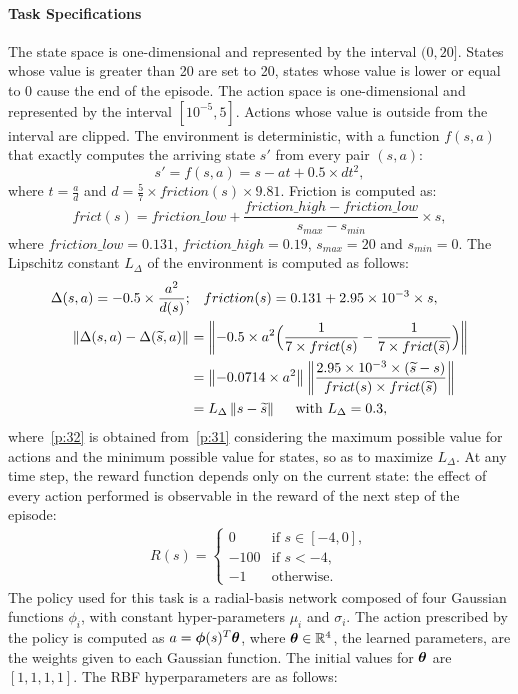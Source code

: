 \paragraph{Task Specifications}
The state space is one-dimensional and represented by the interval $(0,20]$. States whose value is greater than 20 are set to 20, states whose value is lower or equal to 0 cause the end of the episode. The action space is one-dimensional and represented by the interval $[10^{-5}, 5]$. Actions whose value is outside from the interval are clipped. The environment is deterministic, with a function $f(s,a)$ that exactly computes the arriving state $s'$ from every pair $(s,a)$:
\[
s'=f(s,a) = s - at + 0.5 \times dt^2,
\]
where $t=\frac{a}{d}$ and $d = \frac{5}{7} \times friction(s) \times 9.81$.
Friction is computed as:
\[
frict(s) = friction\_low + \frac{friction\_high - friction\_low}{s_{max} - s_{min}} \times s,
\]
where $friction\_low=0.131$, $friction\_high=0.19$, $s_{max}=20$ and $s_{min}=0$. The Lipschitz constant $L_{\Delta}$ of the environment is computed as follows:\\
\begin{align}
\Delta(s,a) = -0.5 \times \frac{a^2}{d(s)}; &\quad friction(s) = 0.131 + 2.95 \times 10^{-3} \times s, \nonumber\\
\left\|\Delta(s,a) - \Delta(\widetilde{s},a)\right\|_{} &= \left\| -0.5 \times a^2 \Big(\frac{1}{7 \times frict(s)} - \frac{1}{7 \times frict(\widetilde{s})} \Big)\right\|_{} \nonumber\\
&= \left\|-0.0714 \times a^2\right\|_{}\left\|\frac {2.95 \times 10^{-3} \times (\widetilde{s} -s)} {frict(s) \times frict(\widetilde{s})}\right\|_{}\label{p:31}\\
&= L_{\Delta} \left\|s - \widetilde{s}\right\|_{} \quad \text{ with }L_{\Delta}=0.3, \label{p:32}
\end{align}
where~\eqref{p:32} is obtained from~\eqref{p:31} considering the maximum possible value for actions and the minimum possible value for states, so as to maximize $L_{\Delta}$.
At any time step, the reward function depends only on the current state: the effect of every action performed is observable in the reward of the next step of the episode: 
\begin{align}
R(s) = 
\begin{cases}
0 & \text{if } s \in [-4,0],\\
-100 & \text{if } s < -4,\\
-1 & \text{otherwise}.
\end{cases} \nonumber
\end{align}
The policy used for this task is a radial-basis network composed of four Gaussian functions $\phi_i$, with constant hyper-parameters $\mu_i$ and $\sigma_i$. The action prescribed by the policy is computed as $a = \boldsymbol{\phi}(s)^T\boldsymbol{\theta}$, where $\boldsymbol{\theta}\in\mathbb{R}^4$, the learned parameters, are the weights given to each Gaussian function. The initial values for $\boldsymbol{\theta}$ are $[1, 1, 1, 1]$. The RBF hyperparameters are as follows: 
